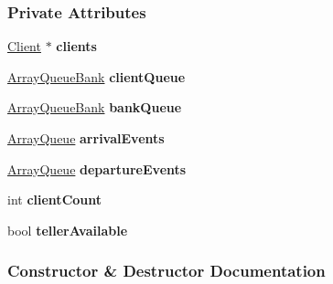 \subsubsection*{Private Attributes}
\begin{DoxyCompactItemize}
\item 
\hyperlink{class_client}{Client} $\ast$ {\bfseries clients}\hypertarget{class_simulation1_a_ac02a6bea729312694efd64936cfb09fe}{}\label{class_simulation1_a_ac02a6bea729312694efd64936cfb09fe}

\item 
\hyperlink{class_array_queue_bank}{Array\+Queue\+Bank} {\bfseries client\+Queue}\hypertarget{class_simulation1_a_a8001f61f724485492c5380c40ec8f8e4}{}\label{class_simulation1_a_a8001f61f724485492c5380c40ec8f8e4}

\item 
\hyperlink{class_array_queue_bank}{Array\+Queue\+Bank} {\bfseries bank\+Queue}\hypertarget{class_simulation1_a_a90996f9ae764354398a2fa41c26b9f65}{}\label{class_simulation1_a_a90996f9ae764354398a2fa41c26b9f65}

\item 
\hyperlink{class_array_queue}{Array\+Queue} {\bfseries arrival\+Events}\hypertarget{class_simulation1_a_a5d13b12c515964653d6cb2dd9911dd81}{}\label{class_simulation1_a_a5d13b12c515964653d6cb2dd9911dd81}

\item 
\hyperlink{class_array_queue}{Array\+Queue} {\bfseries departure\+Events}\hypertarget{class_simulation1_a_ac764c20ec0ea012b892b362739859b5a}{}\label{class_simulation1_a_ac764c20ec0ea012b892b362739859b5a}

\item 
int {\bfseries client\+Count}\hypertarget{class_simulation1_a_aaba1ca6cef545e1ca88a82f4fe100c61}{}\label{class_simulation1_a_aaba1ca6cef545e1ca88a82f4fe100c61}

\item 
bool {\bfseries teller\+Available}\hypertarget{class_simulation1_a_a3b48ecc4fd72db14184cf75c54200133}{}\label{class_simulation1_a_a3b48ecc4fd72db14184cf75c54200133}

\end{DoxyCompactItemize}


\subsubsection{Constructor \& Destructor Documentation}
